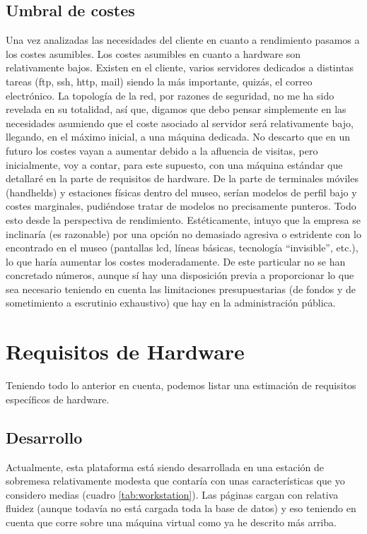 \subsection{Umbral de costes}
\par Una vez analizadas las necesidades del cliente en cuanto a rendimiento pasamos a los costes asumibles. Los costes asumibles en cuanto a hardware son relativamente bajos. Existen en el cliente, varios servidores dedicados a distintas tareas (ftp, ssh, http, mail) siendo la más importante, quizás, el correo electrónico. La topología de la red, por razones de seguridad, no me ha sido revelada en su totalidad, así que, digamos que debo pensar simplemente en las necesidades asumiendo que el coste asociado al servidor será relativamente bajo, llegando, en el máximo inicial, a una máquina dedicada. No descarto que en un futuro los costes vayan a aumentar debido a la afluencia de visitas, pero inicialmente, voy a contar, para este supuesto, con una máquina estándar que detallaré en la parte de requisitos de hardware.
De la parte de terminales móviles (handhelds) y estaciones físicas dentro del museo, serían modelos de perfil bajo y costes marginales, pudiéndose tratar de modelos no precisamente punteros. Todo esto desde la perspectiva de rendimiento. Estéticamente, intuyo que la empresa se inclinaría (es razonable) por una opción no demasiado agresiva o estridente con lo encontrado en el museo (pantallas lcd, líneas básicas, tecnología ``invisible'', etc.), lo que haría aumentar los costes moderadamente. De este particular no se han concretado números, aunque sí hay una disposición previa a proporcionar lo que sea necesario teniendo en cuenta las limitaciones presupuestarias (de fondos y de sometimiento a escrutinio exhaustivo) que hay en la administración pública.

\section{Requisitos de Hardware}
\par Teniendo todo lo anterior en cuenta, podemos listar una estimación de requisitos específicos de hardware.
\subsection{Desarrollo}
\par Actualmente, esta plataforma está siendo desarrollada en una estación de sobremesa relativamente modesta que contaría con unas características que yo considero medias (cuadro \ref{tab:workstation}). Las páginas cargan con relativa fluidez (aunque todavía no está cargada toda la base de datos) y eso teniendo en cuenta que corre sobre una máquina virtual como ya he descrito más arriba.

